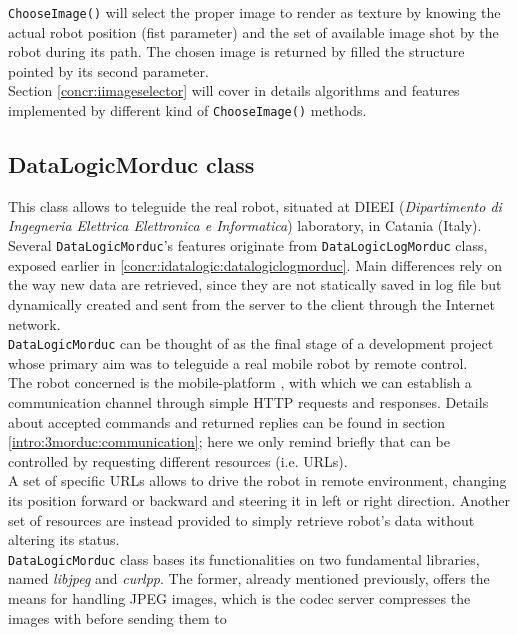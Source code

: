 \texttt{ChooseImage()} will select the proper image to render as texture
by knowing the actual robot position (fist parameter) and the set of available
image shot by the robot during its path. The chosen image is returned by filled
the structure pointed by its second parameter.
\\
Section \ref{concr:iimageselector} will cover in details algorithms and
features implemented by different kind of \texttt{ChooseImage()} methods.

\subsection{DataLogicMorduc class}
\label{concr:idatalogic:datalogicmorduc}

This class allows \framework{} to teleguide the real \morduc{}
robot, situated at DIEEI (\textit{Dipartimento di Ingegneria Elettrica
Elettronica e Informatica}) laboratory, in Catania (Italy).
\\
Several \texttt{DataLogicMorduc}'s features originate 
from \texttt{DataLogicLogMorduc} class, exposed earlier in
\ref{concr:idatalogic:datalogiclogmorduc}. Main differences
rely on the way new data are retrieved, since they are not
statically saved in log file but dynamically created and sent
from the server to the client through the Internet network.
\\
\texttt{DataLogicMorduc} can be thought of as the final
stage of a development project whose primary aim was
to teleguide a real mobile robot by remote control.
\\
The
robot concerned is the mobile-platform \morduc{}, with which
we can
establish a communication channel through simple
HTTP requests and responses. Details about accepted
commands and returned replies can be found in 
section \ref{intro:3morduc:communication}; here we only
remind briefly that \morduc{} can be controlled
by requesting different resources (i.e. URLs).
\\
A set of specific URLs allows to drive the robot in remote
environment, changing its position forward or backward and
steering it in left or right direction. Another set
of resources are instead provided to simply retrieve robot's
data without altering its status.
\\
\texttt{DataLogicMorduc} class bases its functionalities
on two fundamental libraries, named \textit{libjpeg} and
\textit{curlpp}. The former, already mentioned previously,
offers the means for handling JPEG images, which is the codec
server compresses the images with before sending them to
